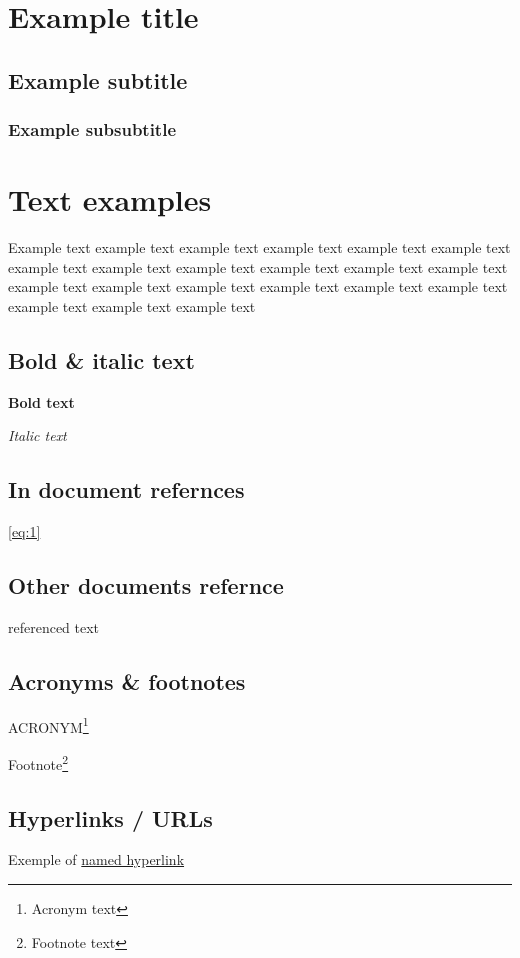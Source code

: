 \section{Example title}
\subsection{Example subtitle}
\subsubsection{Example subsubtitle}


\section{Text examples}
Example text example text example text example text example text example text example text
example text example text example text example text example text example text example text
example text example text example text example text example text example text example text


\subsection{Bold \& italic text}
\textbf{Bold text}

\textit{Italic text}

\subsection{In document refernces}
\autoref{eq:1}

\subsection{Other documents refernce}
referenced text\cite{examplewebsite}


\subsection{Acronyms \& footnotes}

ACRONYM\footnote{Acronym text}

Footnote\footnote{Footnote text}

\subsection{Hyperlinks / URLs}
Exemple of \href{https://example.com}{named hyperlink}

